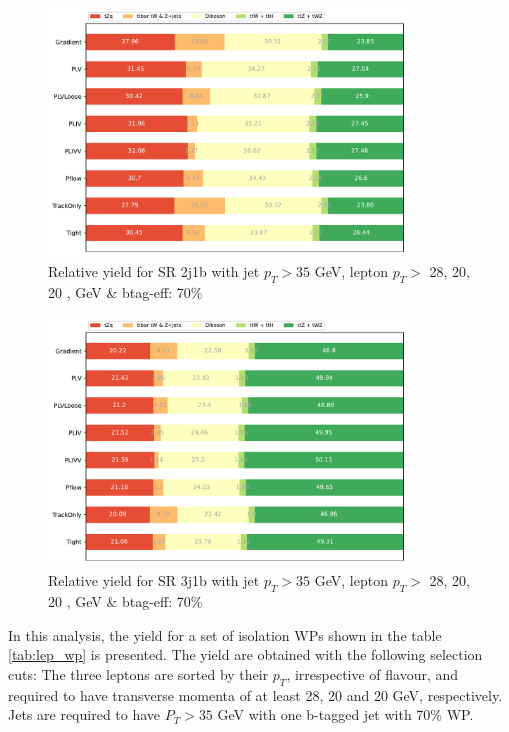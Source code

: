 \begin{figure}[h!]
    \centering
    \includegraphics[width=0.85\textwidth]{ubonn-thesis/Chapters/Chapters_05/Figure/Lepton WPs/percent_plt_2j1b.pdf}
    \caption{Relative yield for SR 2j1b with jet $p_{T} > 35$ GeV, lepton $p_{T} >$ 28, 20, 20 , GeV \& btag-eff: 70\%}
    \label{fig:lep_wp_2j1b}
\end{figure}
 
\begin{figure}[h!]
    \centering
    \includegraphics[width=0.85\textwidth]{ubonn-thesis/Chapters/Chapters_05/Figure/Lepton WPs/percent_plt_3j1b.pdf}
    \caption{Relative yield for SR 3j1b with jet $p_{T} > 35$ GeV, lepton $p_{T} >$ 28, 20, 20 , GeV \& btag-eff: 70\%}
    \label{fig:lep_wp_3j1b}
\end{figure}


In this analysis, the yield for a set of isolation WPs shown in the table \ref{tab:lep_wp} is presented. The yield are obtained with the following selection cuts: The three leptons are sorted by their $p_{T}$, irrespective of flavour, and required to have transverse momenta of at least 28, 20 and 20 GeV, respectively. Jets are required to have $P_{T} > 35$ GeV with one b-tagged jet with 70\% WP.


